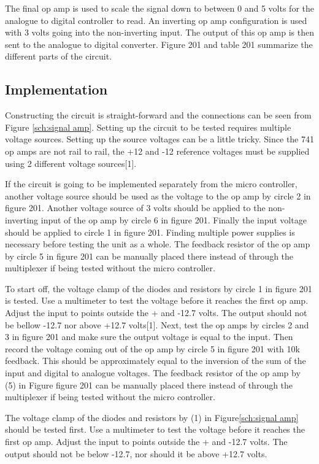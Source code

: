 The final op amp is used to scale the signal down to between 0 and 5 volts for 
the analogue to digital controller to read. An inverting op amp configuration 
is used with 3 volts going into the non-inverting input.
The output of this op amp is then sent to the analogue to digital converter.
Figure 201 and table 201 summarize the different parts of the circuit.

\subsection{Implementation}
Constructing the circuit is straight-forward and the connections can be seen 
from Figure \ref{sch:signal amp}. Setting up the circuit to be tested requires 
multiple voltage sources. Setting up the source voltages can be a little tricky.
Since the 741 op amps are not rail to rail, the +12 and -12 reference voltages 
must be supplied using 2 different voltage sources[1]. 

If the circuit is going to be implemented separately from the micro controller, another voltage source should be used as the voltage to the op amp by circle 
2 in figure 201. Another voltage source of 3 volts should be applied to the 
non-inverting input of the op amp by circle 6 in figure 201. Finally the input 
voltage should be applied to circle 1 in figure 201. Finding multiple power 
supplies is necessary before testing the unit as a whole. 
The feedback resistor of the op amp by circle 5 in figure 201 can be manually 
placed there instead of through the multiplexer if being tested without the 
micro controller. 

To start off, the voltage clamp of the diodes and resistors by circle 1 in 
figure 201 is tested. Use a multimeter to test the voltage before it reaches 
the first op amp. Adjust the input to points outside the + and -12.7 volts. 
The output should not be bellow -12.7 nor above +12.7 volts[1]. 
	Next, test the op amps by circles 2 and 3 in figure 201 and make sure the 
output voltage is equal to the input. Then record the voltage coming out of the
 op amp by circle 5 in figure 201 with 10k feedback. This should be 
approximately equal to the inversion of the sum of the input and digital to 
analogue voltages\cite{bk:olia}.
The feedback resistor of the op amp by (5) in Figure figure 201 can be manually
 placed there instead of through the multiplexer if being tested without the 
micro controller. 

The voltage clamp of the diodes and resistors by (1) in
 Figure\ref{sch:signal amp} should be tested first. Use a multimeter to test
 the voltage before it reaches the first op amp. Adjust the input to points 
outside the + and -12.7 volts. The output should not be below -12.7, nor 
should it be above +12.7 volts.

